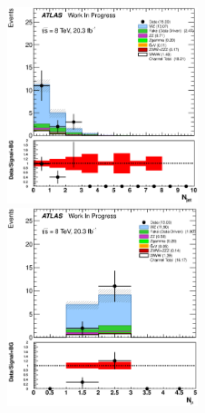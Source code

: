 \begin{figure}[ht!]
\centering
\includegraphics[width=0.495\textwidth]{figures/appendix_signal_selection/Nov24Update_FakeSys_KFacSys_LinearY_Rebin/output/jobs/MxM/DataFull_Rates_May13_FakeRatesExactly2Loose_MuonMxMBJetGt0_ElBJetGt0SubtractPC_MxM/PreselectionNov23_15_1SFOS_ChargeAbs1_BVeto85_ZVetoLow35High25GeV_METGt45GeV_DeltaPhi2p5_physics/weight_all/eps/NJets_histratio.eps}
\includegraphics[width=0.495\textwidth]{figures/appendix_signal_selection/Nov24Update_FakeSys_KFacSys_LinearY_Rebin/output/jobs/MxM/DataFull_Rates_May13_FakeRatesExactly2Loose_MuonMxMBJetGt0_ElBJetGt0SubtractPC_MxM/PreselectionNov23_15_1SFOS_ChargeAbs1_BVeto85_ZVetoLow35High25GeV_METGt45GeV_DeltaPhi2p5_NJetLt2_physics/weight_all/eps/NMuons_histratio.eps}



\end{figure}
